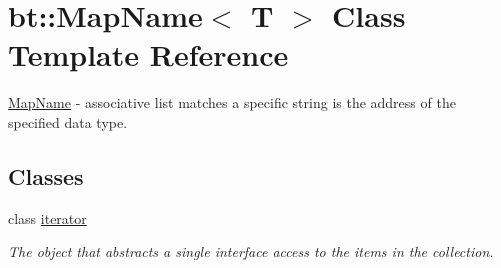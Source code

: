 \hypertarget{classbt_1_1_map_name}{\section{bt\-:\-:Map\-Name$<$ T $>$ Class Template Reference}
\label{classbt_1_1_map_name}
}


\hyperlink{classbt_1_1_map_name}{Map\-Name} -\/ associative list matches a specific string is the address of the specified data type.  


\subsection*{Classes}
\begin{DoxyCompactItemize}
\item 
class \hyperlink{classbt_1_1_map_name_1_1iterator}{iterator}
\begin{DoxyCompactList}\small\item\em The object that abstracts a single interface access to the items in the collection. \end{DoxyCompactList}\end{DoxyCompactItemize}
